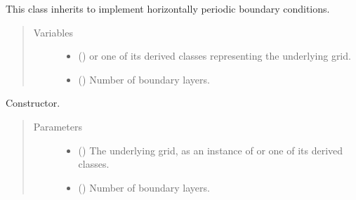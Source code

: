 \documentclass[letterpaper,10pt,english]{sphinxmanual}
\begin{document}

\begin{fulllineitems}
\label{\detokenize{api:dycore.horizontal_boundary_periodic.Periodic}}
This class inherits  to implement horizontally
periodic boundary conditions.
\begin{quote}\begin{description}
\item[{Variables}] \leavevmode\begin{itemize}
\item {} 
 () \textendash{}  or one of its derived classes representing the underlying grid.

\item {} 
{\hyperref[\detokenize{api:dycore.prognostic_isentropic.PrognosticIsentropic.nb}]{}} () \textendash{} Number of boundary layers.

\end{itemize}

\end{description}\end{quote}

\begin{fulllineitems}
\label{\detokenize{api:dycore.horizontal_boundary_periodic.Periodic.__init__}}
Constructor.
\begin{quote}\begin{description}
\item[{Parameters}] \leavevmode\begin{itemize}
\item {} 
 () \textendash{} The underlying grid, as an instance of  or one of its derived classes.

\item {} 
 () \textendash{} Number of boundary layers.

\end{itemize}


\end{description}
\end{quote}
\end{fulllineitems}
\end{fulllineitems}
\end{document}
